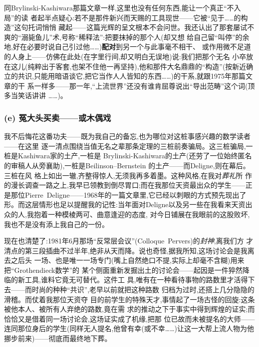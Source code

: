 \pmark{}同Brylinski-Kashiwara那篇文章一样,这里也没有任何东西,能让一个真正“不入局”的读
者起半点疑心:若不是那件新兴而天赐的工具现世——它被“见于……的构造”这句托词悄悄
藏起——这篇光辉的呈文根本不会问世。我还认出了那套屡试不爽的“溺毙鱼儿”术,号称“稀释法”:把要抹掉的那个人(却又想
给自己留“叫停”的余地,好在必要时说自己引过他……)\textbf{配对}到另一个与此事毫不相干、
或作用微不足道的人身上——仿佛在此处(在字里行间,却又明白无误地)说:我们把那个无名
小卒放在这儿(纯粹出于客套,也架不住他一再坚持),他和那件大名鼎鼎的“构造”(按新近确
立的共识,只能用暗语谈它,把它当作人人皆知的东西……)的干系,就跟1975年那篇文章的干
系一样多——那一年,“上流世界”还没有谁肯屈尊说出“导出范畴”这个词(顶多当笑话讲讲
……)。

\subsubsection*{(e) 冤大头买卖——或木偶戏}

我不后悔花这番功夫——既为我自己的备忘,也为哪位对这桩事感兴趣的数学读者——在这里
逐一清点围绕当值无名之辈那条定理的三桩前奏骗局。这三桩骗局,一桩是Kashiwara家的土产,一桩是
Brylinski-Kashiwara的土产(还劳了一位始终匿名的审稿人从旁襄助),一桩是Beilinson--Bernstein
的土产——而Deligne,则在幕后。三桩在风
格上如出一辙,齐整得惊人,无须我再多着墨。这种风格,在我对\emph{葬礼}所
作的漫长调查一路之上,我早已领教到倒尽胃口;而在我那位天资最出众的学生——正是那位Pierre~Deligne——1968年的一篇文章里,它已经以刺眼的方式预先现出了形。而这层情形也足以\dmark{}提醒我的记性:当年面对Deligne以及另一些在我看来天资出众的人,我抱着一种模棱两可、曲意逢迎的态度,
对今日铺展在我眼前的这股败坏,我也不是没有添上我自己的一份。

现在也清楚了:1981年6月那场“反常层会议”(Colloque~Pervers)的\emph{封神},离我们方
才清点的第三段插曲不过半年,绝非从天而降。说也奇怪,据我所知,这场讨论会是我离去之后头
一场、也是唯一一场专门(嘴上自然绝口不提,实际上却毫不含糊)用来把“Grothendieck数学”的
某个侧面重新发掘出土的讨论会——起因是一件猝然降临的新工具,谁料它竟无可替代。这件工
具,唯有在一种看待事物的路数里才活得下去——而时尚的种种“共识”,老早以前就把这种路数
归档为过时,还搭上几分隐隐的滑稽。而仗着我那位天资夺
目的前学生的特殊天才,事情起了一场古怪的回旋:这条被他本人、被所有人弃绝的路数,竟在需
求的推动之下于事实中得到辉煌的证实;而恰恰又是借着同一场讨论会,这场证实成了机缘,把那
位已故而未被提名的大师——连同那位身后的学生(同样无人提名,他曾有幸(或不幸……)让这一大帮上流人物为他挪步前来)——彻底而最终地下葬。

